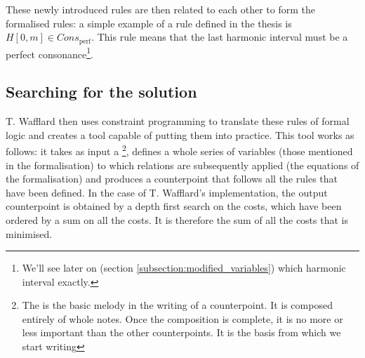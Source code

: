 These newly introduced rules are then related to each other to form the formalised rules: a simple example of a rule defined in the thesis is $H[0, m] \in Cons_{\text{perf}}$. This rule means that the last harmonic interval must be a perfect consonance\footnote{We'll see later on (section \ref{subsection:modified_variables}) which harmonic interval exactly.}.

\subsection{Searching for the solution}
T. Wafflard then uses constraint programming to translate these rules of formal logic and creates a tool capable of putting them into practice. This tool works as follows: it takes as input a \cf\footnote{The \cfs is the basic melody in the writing of a counterpoint. It is composed entirely of whole notes. Once the composition is complete, it is no more or less important than the other counterpoints. It is the basis from which we start writing}, defines a whole series of variables (those mentioned in the formalisation) to which relations are subsequently applied (the equations of the formalisation) and produces a counterpoint that follows all the rules that have been defined. In the case of T. Wafflard's implementation, the output counterpoint is obtained by a depth first search on the costs, which have been ordered by a sum on all the costs. It is therefore the sum of all the costs that is minimised.



